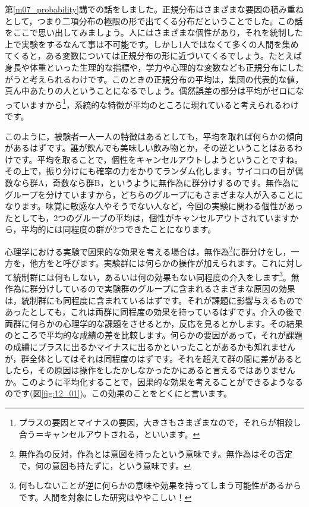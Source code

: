 \documentclass{ltjbook}
\begin{document}
第\ref{m07_probability}講での話をしました。正規分布はさまざまな要因の積み重ねとして，つまり二項分布の極限の形で出てくる分布だということでした。この話をここで思い出してみましょう。人にはさまざまな個性があり，それを統制した上で実験をするなんて事は不可能です。しかし1人ではなくて多くの人間を集めてくると，ある変数については正規分布の形に近づいてくるでしょう。たとえば身長や体重といった生理的な指標や，学力や心理的な変数なども正規分布にしたがうと考えられるわけです。このときの正規分布の平均は，集団の代表的な値，真ん中あたりの人ということになるでしょう。偶然誤差の部分は平均がゼロになっていますから\footnote{プラスの要因とマイナスの要因，大きさもさまざまなので，それらが相殺し合う＝キャンセルアウトされる，といいます。}，系統的な特徴が平均のところに現れていると考えられるわけです。

このように，被験者一人一人の特徴はあるとしても，平均を取れば何らかの傾向があるはずです。誰が飲んでも美味しい飲み物とか，その逆ということはあるわけです。平均を取ることで，個性をキャンセルアウトしようということですね。
その上で，振り分けにも確率の力をかりてランダム化します。サイコロの目が偶数なら群A，奇数なら群B，というように無作為に群分けするのです。無作為にグループを分けていますから，どちらのグループにもさまざまな人が入ることになります。味覚に敏感な人やそうでない人など，今回の実験に関わる個性があったとしても，2つのグループの平均は，個性がキャンセルアウトされていますから，平均的には同程度の群が2つできたことになります。

心理学における実験で因果的な効果を考える場合は，無作為\footnote{無作為の反対，作為とは意図を持ったという意味です。無作為はその否定で，何の意図も持たずに，という意味です。}に群分けをし，一方を，他方をと呼びます。実験群には何らかの操作が加えられます。これに対して統制群には何もしない，あるいは何の効果もない同程度の介入をします\footnote{何もしないことが逆に何らかの意味や効果を持ってしまう可能性があるからです。人間を対象にした研究はややこしい！}。無作為に群分けしているので実験群のグループに含まれるさまざまな原因の効果は，統制群にも同程度に含まれているはずです。それが課題に影響与えるものであったとしても，これは両群に同程度の効果を持っているはずです。介入の後で両群に何らかの心理学的な課題をさせるとか，反応を見るとかします。その結果のところで平均的な成績の差を比較します。何らかの要因があって，それが課題の成績にプラスに出るかマイナスに出るかといったことがあるかも知れませんが，群全体としてはそれは同程度のはずです。それを超えて群の間に差があるとしたら，その原因は操作をしたかしなかったかにあると言えるではありませんか。このように平均化することで，因果的な効果を考えることができるようなるのです(図\ref{fig:12_01})。この効果のことをとくにと言います。
\end{document}
